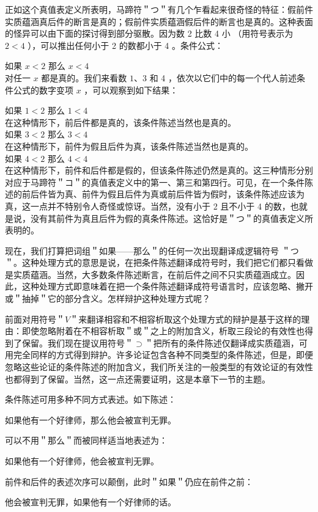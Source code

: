 正如这个真值表定义所表明，马蹄符＂つ＂有几个乍看起来很奇怪的特征：假前件实质蕴涵真后件的断言是真的；假前件实质蕴涵假后件的断言也是真的。这种表面的怪异可以由下面的探讨得到部分驱散。因为数 2 比数 4 小 （用符号表示为 $2<4$ ），可以推出任何小于 2 的数都小于 4 。条件公式：

如果 $x<2$ 那么 $x<4$\\
对任一 $x$ 都是真的。我们来看数 $1 、 3$ 和 4 ，依次以它们中的每一个代人前述条件公式的数字变项 $x$ ，可以观察到如下结果：

如果 $1<2$ 那么 $1<4$\\
在这种情形下，前后件都是真的，该条件陈述当然也是真的。\\
如果 $3<2$ 那么 $3<4$\\
在这种情形下，前件为假且后件为真，该条件陈述当然也是真的。\\
如果 $4<2$ 那么 $4<4$\\
在这种情形下，前件和后件都是假的，但该条件陈述仍然是真的。这三种情形分别对应于马蹄符＂コ＂的真值表定义中的第一、第三和第四行。可见，在一个条件陈述的前后件皆为真、前件为假且后件为真或前后件皆为假时，该条件陈述应该为真，这一点并不特别令人奇怪或惊讶。当然，没有小于 2 且不小于 4 的数，也就是说，没有其前件为真且后件为假的真条件陈述。这恰好是＂つ＂的真值表定义所表明的。

现在，我们打算把词组＂如果——那么＂的任何一次出现翻译成逻辑符号 ＂つ＂。这种处理方式的意思是说，在把条件陈述翻译成符号时，我们把它们都只看做是实质蕴涵。当然，大多数条件陈述断言，在前后件之间不只实质蕴涵成立。因此，这种处理方式即意味着在把一个条件陈述翻译成符号语言时，应该忽略、撇开或＂抽掉＂它的部分含义。怎样辩护这种处理方式呢？

前面对用符号＂$V$＂来翻译相容和不相容析取这个处理方式的辩护是基于这样的理由：即使忽略附着在不相容析取＂或＂之上的附加含义，析取三段论的有效性也得到了保留。我们现在提议用符号＂$\supset$＂把所有的条件陈述仅翻译成实质蕴涵，可用完全同样的方式得到辩护。许多论证包含各种不同类型的条件陈述，但是，即便忽略这些论证的条件陈述的附加含义，我们所关注的一般类型的有效论证的有效性也都得到了保留。当然，这一点还需要证明，这是本章下一节的主题。

条件陈述可用多种不同方式表述。如下陈述：

如果他有一个好律师，那么他会被宣判无罪。

可以不用＂那么＂而被同样适当地表述为：

如果他有一个好律师，他会被宣判无罪。

前件和后件的表述次序可以颠倒，此时＂如果＂仍应在前件之前：

他会被宣判无罪，如果他有一个好律师的话。

